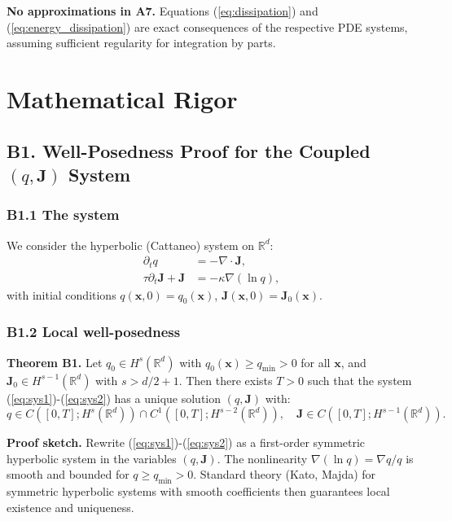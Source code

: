 \documentclass[reprint]{revtex4-2}
\begin{document}
\textbf{No approximations in A7.} Equations (\ref{eq:dissipation}) and (\ref{eq:energy_dissipation}) are exact consequences of the respective PDE systems, assuming sufficient regularity for integration by parts.

\section{Mathematical Rigor}

\subsection{B1. Well-Posedness Proof for the Coupled $(q,\mathbf{J})$ System}

\subsubsection{B1.1 The system}

We consider the hyperbolic (Cattaneo) system on $\mathbb{R}^d$:
\begin{align}
\partial_t q &= -\nabla\cdot\mathbf{J}, \label{eq:sys1}\\
\tau\partial_t\mathbf{J} + \mathbf{J} &= -\kappa\nabla(\ln q), \label{eq:sys2}
\end{align}
with initial conditions $q(\mathbf{x},0)=q_0(\mathbf{x})$, $\mathbf{J}(\mathbf{x},0)=\mathbf{J}_0(\mathbf{x})$.

\subsubsection{B1.2 Local well-posedness}

\textbf{Theorem B1.} Let $q_0 \in H^s(\mathbb{R}^d)$ with $q_0(\mathbf{x}) \ge q_{\min} > 0$ for all $\mathbf{x}$, and $\mathbf{J}_0 \in H^{s-1}(\mathbb{R}^d)$ with $s > d/2+1$. Then there exists $T>0$ such that the system (\ref{eq:sys1})-(\ref{eq:sys2}) has a unique solution $(q,\mathbf{J})$ with:
\begin{equation}
q \in C([0,T]; H^s(\mathbb{R}^d)) \cap C^1([0,T]; H^{s-2}(\mathbb{R}^d)), \quad \mathbf{J} \in C([0,T]; H^{s-1}(\mathbb{R}^d)).
\end{equation}

\textbf{Proof sketch.} Rewrite (\ref{eq:sys1})-(\ref{eq:sys2}) as a first-order symmetric hyperbolic system in the variables $(q, \mathbf{J})$. The nonlinearity $\nabla(\ln q) = \nabla q/q$ is smooth and bounded for $q \ge q_{\min} > 0$. Standard theory (Kato, Majda) for symmetric hyperbolic systems with smooth coefficients then guarantees local existence and uniqueness.
\end{document}
